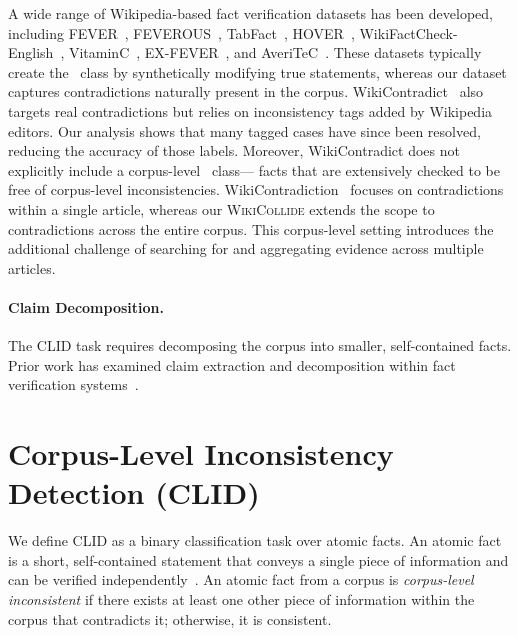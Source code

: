 \documentclass[11pt]{article}
\newcommand{\task}[0]{CLID\xspace}
\newcommand{\dataset}[0]{\textsc{WikiCollide}\xspace}
\newcommand{\supports}{%
\tcbox[colback=green!10,colframe=green!50!black,boxrule=0.3pt,arc=2pt,
top=-3.5pt,bottom=-3.5pt,left=0.5pt,right=0.5pt,
nobeforeafter,tcbox raise base]{\texttt{\strut Supports}}%
}
\newcommand{\refutes}{%
\tcbox[colback=red!10,colframe=red!50!black,boxrule=0.3pt,arc=2pt,
top=-3.5pt,bottom=-3.5pt,left=0.5pt,right=0.5pt,
nobeforeafter,tcbox raise base]{\texttt{\strut Refutes}}%
}
\begin{document}
A wide range of Wikipedia-based fact verification datasets has been developed, including FEVER~\citep{thorne-etal-2018-fact}, FEVEROUS~\citep{feverous}, TabFact~\citep{chen2020tabfactlargescaledatasettablebased}, HOVER~\citep{jiang-etal-2020-hover}, WikiFactCheck-English~\citep{sathe-etal-2020-automated}, VitaminC~\citep{schuster-etal-2021-get}, EX-FEVER~\citep{ma-etal-2024-ex}, and AveriTeC~\citep{schlichtkrull-etal-2024-automated}. These datasets typically create the \refutes~class by synthetically modifying true statements, whereas our dataset captures contradictions naturally present in the corpus. WikiContradict~\citep{hou2024wikicontradict} also targets real contradictions but relies on inconsistency tags added by Wikipedia editors. Our analysis shows that many tagged cases have since been resolved, reducing the accuracy of those labels. Moreover, WikiContradict does not explicitly include a corpus-level \supports~class--- facts that are extensively checked to be free of corpus-level inconsistencies. WikiContradiction~\cite{hsu2021wikicontradiction} focuses on contradictions within a single article, whereas our \dataset extends the scope to contradictions across the entire corpus. This corpus-level setting introduces the additional challenge of searching for and aggregating evidence across multiple articles.

\paragraph{Claim Decomposition.}
The \task task requires decomposing the corpus into smaller, self-contained facts. Prior work has examined claim extraction and decomposition within fact verification systems~\citep{hu2024decompositiondilemmasdoesclaim, wührl2024selfadaptiveparaphrasingpreferencelearning, min2023factscore, song2024veriscore, cattan2024localizingfactualinconsistenciesattributable, gunjal-durrett-2024-molecular, pham-etal-2025-verify}.







\section{Corpus-Level Inconsistency Detection (\task)}\label{sec:task}

We define \task as a binary classification task over atomic facts. An atomic fact~\citep{min-etal-2023-factscore} is a short, self-contained statement that conveys a single piece of information and can be verified independently~\citep{semnani-etal-2023-wikichat, gunjal-durrett-2024-molecular}. An atomic fact from a corpus is \emph{corpus-level inconsistent} if there exists at least one other piece of information within the corpus that contradicts it; otherwise, it is consistent.
\end{document}
